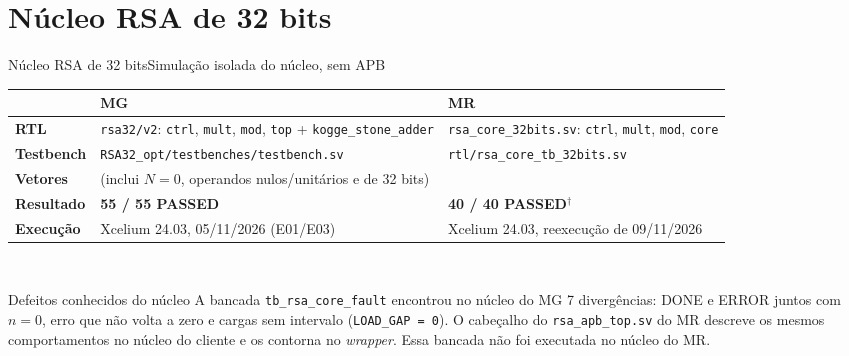 \documentclass[aspectratio=169,10pt,t]{beamer}
\newcommand{\rex}{$^{\dagger}$}
\newcommand{\MG}{\textbf{\color{tmCafe}MG}}
\newcommand{\MR}{\textbf{\color{tmVermelho}MR}}
\begin{document}
\section{Núcleo RSA de 32 bits}
\begin{frame}{Núcleo RSA de 32 bits}{Simulação isolada do núcleo, sem APB}
  \footnotesize
  \renewcommand{\arraystretch}{1.2}
  \begin{tabularx}{\textwidth}{@{}>{\bfseries}p{2.6cm} >{\raggedright\arraybackslash}X >{\raggedright\arraybackslash}X@{}}
    \toprule
     & \MG & \MR \\
    \midrule
    RTL & \texttt{rsa32/v2}: \texttt{ctrl}, \texttt{mult}, \texttt{mod}, \texttt{top} + \texttt{kogge\_stone\_adder} & \texttt{rsa\_core\_32bits.sv}: \texttt{ctrl}, \texttt{mult}, \texttt{mod}, \texttt{core} \\
    Testbench & \texttt{RSA32\_opt/testbenches/testbench.sv} & \texttt{rtl/rsa\_core\_tb\_32bits.sv} \\
    Vetores & 55 (inclui $N = 0$, operandos nulos/unitários e de 32 bits) & 40 \\
    Resultado & \textbf{\color{tmOliva}55 / 55 PASSED} & \textbf{\color{tmOliva}40 / 40 PASSED}\rex \\
    Execução & Xcelium 24.03, 05/11/2026 (E01/E03) & Xcelium 24.03, reexecução de 09/11/2026 \\
    \bottomrule
  \end{tabularx}\\[0.25cm]
  \begin{block}{Defeitos conhecidos do núcleo}
    \scriptsize
    A bancada \texttt{tb\_rsa\_core\_fault} encontrou no núcleo do MG 7 divergências: DONE e ERROR juntos com $n = 0$, erro que não volta a zero e cargas sem intervalo (\texttt{LOAD\_GAP = 0}). O cabeçalho do \texttt{rsa\_apb\_top.sv} do MR descreve os mesmos comportamentos no núcleo do cliente e os contorna no \emph{wrapper}. Essa bancada não foi executada no núcleo do MR.
  \end{block}
\end{frame}

\end{document}
